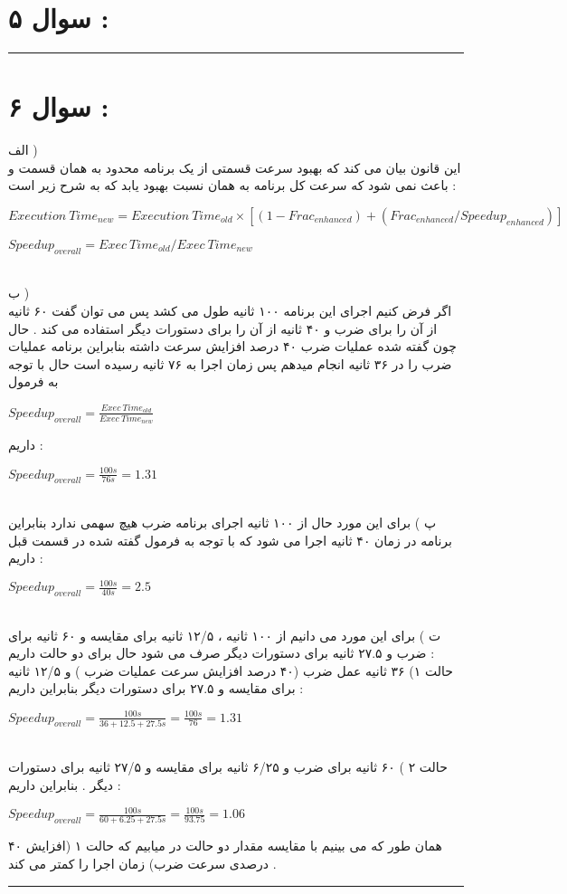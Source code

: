 \documentclass{article}
\begin{document}
	\section*{سوال ۵  : }
	
	\hrule
	\section*{سوال ۶ : }
	الف )‌
	\\
	این قانون بیان می کند که بهبود سرعت قسمتی از یک برنامه محدود به همان قسمت و باعث نمی شود که سرعت کل برنامه به همان نسبت بهبود یابد که به شرح زیر است  : 
	\begin{center}
		$ Execution \ Time _{new} = Execution \ Time _{old} \times [(1-Frac_{enhanced}) + (Frac_{enhanced}  / Speedup_{enhanced})]$
	\end{center}
\begin{center}
	$ Speedup_{overall} = Exec \ Time_{old} / Exec \ Time _{new}$
\end{center}
\\
ب ) 
\\
اگر فرض کنیم اجرای این برنامه ۱۰۰ ثانیه طول می کشد پس می توان گفت ۶۰ ثانیه از آن را برای ضرب و ۴۰ ثانیه از آن را برای دستورات دیگر استفاده می کند  . حال چون گفته شده عملیات ضرب ۴۰ درصد افزایش سرعت داشته بنابراین برنامه عملیات ضرب را در ۳۶ ثانیه انجام میدهم  پس زمان اجرا به ۷۶ ثانیه رسیده است حال  با توجه به فرمول 
\begin{center}
$Speedup_{overall} = \frac {Exec \ Time_{old}}{Exec \ Time_{new}}$
\end{center}

داریم  : 
\begin{center}
	$Speedup_{overall}  = \frac{100s}{76s} = 1.31$
\end{center}
\\
پ ) برای این مورد حال از ۱۰۰ ثانیه اجرای برنامه ضرب هیچ سهمی ندارد بنابراین برنامه در زمان ۴۰ ثانیه اجرا می شود که با توجه به فرمول گفته شده در قسمت قبل داریم : 
\begin{center}
	$Speedup_{overall}  = \frac{100s}{40s} = 2.5$
\end{center}
\\
ت ) برای این مورد می دانیم از ۱۰۰ ثانیه ، ۱۲/۵ ثانیه برای مقایسه و ۶۰ ثانیه برای ضرب و ۲۷.۵ ثانیه برای دستورات دیگر صرف می شود حال برای دو حالت داریم  : 
\\ 
حالت ۱) ۳۶ ثانیه عمل ضرب (۴۰ درصد افزایش سرعت عملیات ضرب ) و ۱۲/۵ ثانیه برای مقایسه و ۲۷.۵ برای دستورات دیگر  بنابراین داریم  : 
\begin{center}
  $Speedup_{overall}  = \frac{100s}{36 + 12.5 + 27.5s} = \frac{100s}{76} = 1.31$
\end{center}
\\
حالت ۲ ) ۶۰ ثانیه برای ضرب و ۶/۲۵ ثانیه برای مقایسه و ۲۷/۵ ثانیه برای دستورات دیگر . بنابراین داریم : 
\begin{center}
 $Speedup_{overall}  = \frac{100s}{60 + 6.25 + 27.5s} = \frac{100s}{93.75} = 1.06$
\end{center}
همان طور که می بینیم با مقایسه مقدار دو حالت در میابیم که حالت ۱ (افزایش ۴۰ درصدی سرعت ضرب) زمان اجرا را کمتر می کند  . 
\hrule
\end{document}
